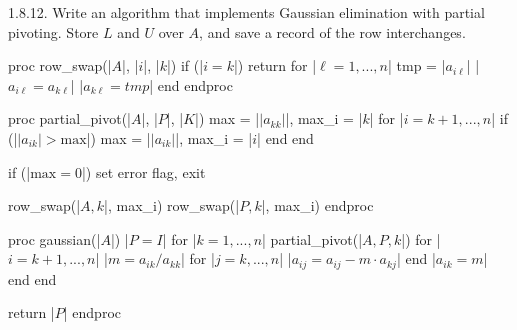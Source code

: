 \documentclass{report}
\begin{document}
    \pagebreak \bigbreak \noindent 
    \begin{mdframed}
        1.8.12. Write an algorithm that implements Gaussian elimination with partial pivoting. Store $L$ and $U$ over $A$, and save a record of the row interchanges. 
    \end{mdframed}
    \bigbreak \noindent 
    \begin{cppcode}
    proc row_swap(|$A$|, |$i$|, |$k$|)
        if (|$i = k$|) return
        for |$\ell = 1,...,n$|
            tmp = |$a_{i\ell}$|  
            |$a_{i\ell} = a_{k\ell}$|
            |$a_{k\ell} = tmp$|
        end
    endproc

    proc partial_pivot(|$A$|, |$P$|, |$K$|)
        max = |$\lvert a_{kk} \rvert $|, max_i = |$k$|
        for |$i=k+1,...,n$|
            if (|$\lvert a_{ik}\rvert > \text{max}$|)
                max = |$\lvert a_{ik} \rvert $|, max_i = |$i$|
            end
        end

        if (|$\text{max} = 0$|) set error flag, exit

        row_swap(|$A,k$|, max_i)
        row_swap(|$P,k$|, max_i)
    endproc

    proc gaussian(|$A$|)
        |$P = I$|
        for |$k=1,...,n$|
            partial_pivot(|$A,P,k$|)
            for |$i=k+1,...,n$|
                |$m = a_{ik} / a_{kk}$|
                for |$j=k,...,n$|
                    |$a_{ij} = a_{ij} - m \cdot a_{kj}$|
                end
                |$a_{ik} = m$|
            end
        end
        
        return |$P$|
    endproc
    \end{cppcode}
\end{document}
